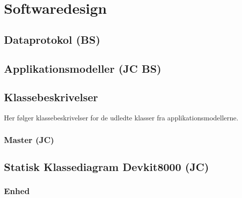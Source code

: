 \chapter{Softwaredesign}

\section{Dataprotokol (BS)}


\section{Applikationsmodeller (JC BS)}


\section{Klassebeskrivelser}
Her følger klassebeskrivelser for de udledte klasser fra applikationsmodellerne.

\subsection{Master (JC)}






\clearpage
\vspace{10 mm}

\section{Statisk Klassediagram Devkit8000 (JC)}



\clearpage

\subsection{Enhed}







